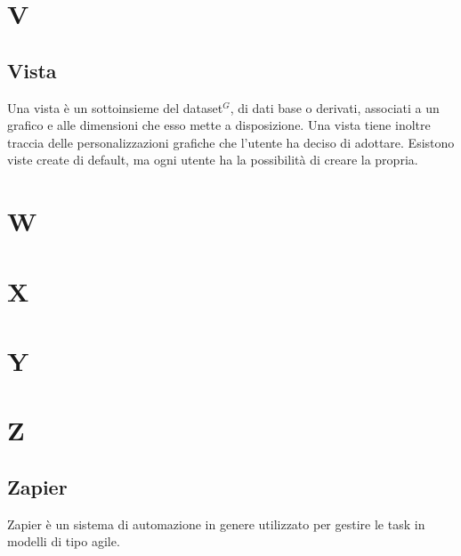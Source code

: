 \newpage
\section{V}
\subsection{Vista}
Una vista è un sottoinsieme del dataset$^{G}$, di dati base o derivati, associati a un grafico e alle dimensioni che esso mette a disposizione. Una vista tiene inoltre traccia delle personalizzazioni grafiche che l'utente ha deciso di adottare. Esistono viste create di default, ma ogni utente ha la possibilità di creare la propria.

\newpage
\section{W}

\newpage
\section{X}

\newpage
\section{Y}

\newpage
\section{Z}
\subsection{Zapier}
Zapier è un sistema di automazione in genere utilizzato per gestire le task in modelli di tipo agile.